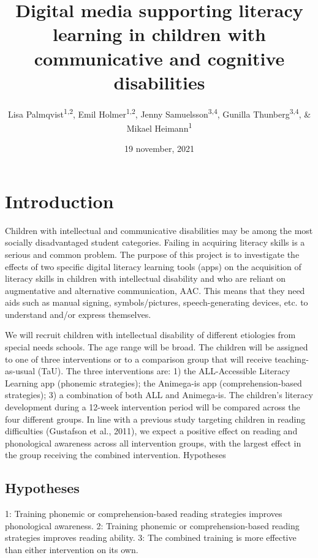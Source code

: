 \documentclass[
  english,
  ,man]{apa6}
\title{Digital media supporting literacy learning in children with communicative and cognitive disabilities}
\author{Lisa Palmqvist\textsuperscript{1,2}, Emil Holmer\textsuperscript{1,2}, Jenny Samuelsson\textsuperscript{3,4}, Gunilla Thunberg\textsuperscript{3,4}, \& Mikael Heimann\textsuperscript{1}}
\date{19 november, 2021}
\affiliation{\vspace{0.5cm}\textsuperscript{1} Department of Behavioural Sciences and Learning, Linköping University\\\textsuperscript{2} The Swedish Institute of Disability Research\\\textsuperscript{3} DART\\\textsuperscript{4} GU}
\begin{document}
\maketitle



\hypertarget{introduction}{%
\section{Introduction}\label{introduction}}

Children with intellectual and communicative disabilities may be among the most socially disadvantaged student categories. Failing in acquiring literacy skills is a serious and common problem. The purpose of this project is to investigate the effects of two specific digital literacy learning tools (apps) on the acquisition of literacy skills in children with intellectual disability and who are reliant on augmentative and alternative communication, AAC. This means that they need aids such as manual signing, symbols/pictures, speech-generating devices, etc. to understand and/or express themselves.

We will recruit children with intellectual disability of different etiologies from special needs schools. The age range will be broad. The children will be assigned to one of three interventions or to a comparison group that will receive teaching-as-usual (TaU). The three interventions are: 1) the ALL-Accessible Literacy Learning app (phonemic strategies); the Animega-is app (comprehension-based strategies); 3) a combination of both ALL and Animega-is. The children's literacy development during a 12-week intervention period will be compared across the four different groups. In line with a previous study targeting children in reading difficulties (Gustafson et al., 2011), we expect a positive effect on reading and phonological awareness across all intervention groups, with the largest effect in the group receiving the combined intervention.
Hypotheses

\hypertarget{hypotheses}{%
\subsection{Hypotheses}\label{hypotheses}}

1: Training phonemic or comprehension-based reading strategies improves phonological awareness.
2: Training phonemic or comprehension-based reading strategies improves reading ability.
3: The combined training is more effective than either intervention on its own.
\end{document}
